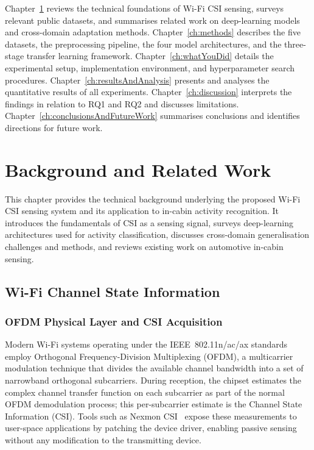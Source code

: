 \documentclass[english,bibtex]{kththesis}
\begin{document}
Chapter~\ref{ch:background} reviews the technical foundations of Wi-Fi CSI sensing, surveys relevant public datasets, and summarises related work on deep-learning models and cross-domain adaptation methods. Chapter~\ref{ch:methods} describes the five datasets, the preprocessing pipeline, the four model architectures, and the three-stage transfer learning framework. Chapter~\ref{ch:whatYouDid} details the experimental setup, implementation environment, and hyperparameter search procedures. Chapter~\ref{ch:resultsAndAnalysis} presents and analyses the quantitative results of all experiments. Chapter~\ref{ch:discussion} interprets the findings in relation to RQ1 and RQ2 and discusses limitations. Chapter~\ref{ch:conclusionsAndFutureWork} summarises conclusions and identifies directions for future work.

\cleardoublepage

\chapter{Background and Related Work}
\label{ch:background}

This chapter provides the technical background underlying the proposed Wi-Fi CSI sensing system and its application to in-cabin activity recognition. It introduces the fundamentals of CSI as a sensing signal, surveys deep-learning architectures used for activity classification, discusses cross-domain generalisation challenges and methods, and reviews existing work on automotive in-cabin sensing.

\section{Wi-Fi Channel State Information}
\label{sec:csi}

\subsection{OFDM Physical Layer and CSI Acquisition}
\label{sec:csi-ofdm}

Modern Wi-Fi systems operating under the IEEE~802.11n/ac/ax standards employ Orthogonal Frequency-Division Multiplexing (OFDM), a multicarrier modulation technique that divides the available channel bandwidth into a set of narrowband orthogonal subcarriers. During reception, the chipset estimates the complex channel transfer function on each subcarrier as part of the normal OFDM demodulation process; this per-subcarrier estimate is the Channel State Information (CSI). Tools such as Nexmon CSI~\cite{gringoli2019free} expose these measurements to user-space applications by patching the device driver, enabling passive sensing without any modification to the transmitting device.
\end{document}

